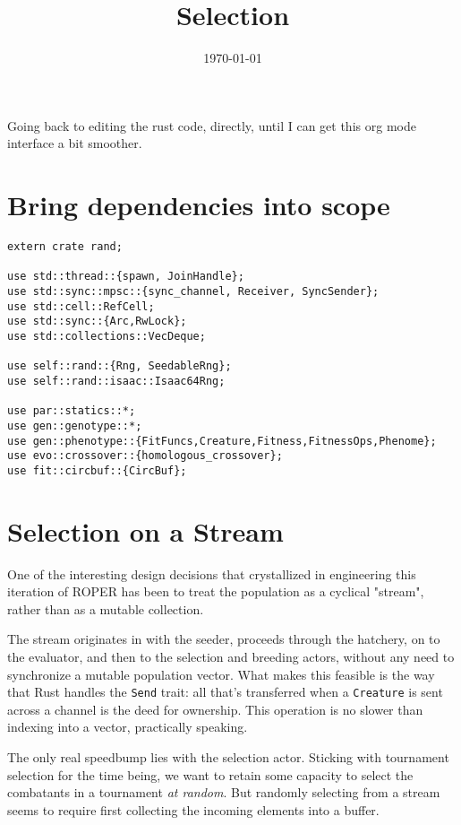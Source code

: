 \documentclass[11pt]{article}
\date{\today}
\title{Selection}
\begin{document}
\maketitle
\tableofcontents

Going back to editing the rust code, directly, until I can get
this org mode interface a bit smoother.

\section{Bring dependencies into scope}
\label{sec:org181e2b5}
\lstset{language=rust,label=orga005cc5,caption= ,captionpos=b,numbers=none}
\begin{lstlisting}
extern crate rand; 

use std::thread::{spawn, JoinHandle};
use std::sync::mpsc::{sync_channel, Receiver, SyncSender};
use std::cell::RefCell;
use std::sync::{Arc,RwLock}; 
use std::collections::VecDeque;

use self::rand::{Rng, SeedableRng};
use self::rand::isaac::Isaac64Rng;

use par::statics::*;
use gen::genotype::*;
use gen::phenotype::{FitFuncs,Creature,Fitness,FitnessOps,Phenome};
use evo::crossover::{homologous_crossover};
use fit::circbuf::{CircBuf};
\end{lstlisting}

\section{Selection on a Stream}
\label{sec:org57e793b}

One of the interesting design decisions that crystallized in engineering
this iteration of ROPER has been to treat the population as a cyclical
"stream", rather than as a mutable collection. 

The stream originates in with the seeder, proceeds through the hatchery,
on to the evaluator, and then to the selection and breeding actors, without
any need to synchronize a mutable population vector. What makes this feasible
is the way that Rust handles the \texttt{Send} trait: all that's transferred when a
\texttt{Creature} is sent across a channel is the deed for ownership. This operation
is no slower than indexing into a vector, practically speaking. 

The only real speedbump lies with the selection actor. Sticking with tournament
selection for the time being, we want to retain some capacity to select the
combatants in a tournament \emph{at random}. But randomly selecting from a stream
seems to require first collecting the incoming elements into a buffer. 
\end{document}
